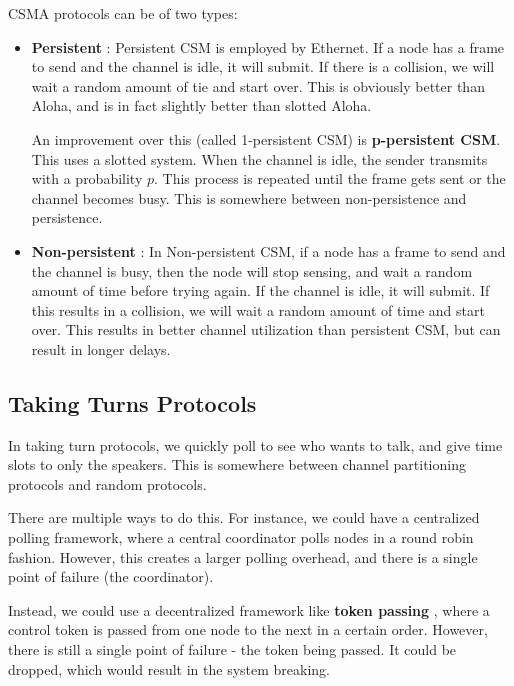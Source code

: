 \documentclass[12pt,letterpaper]{book}
\theoremstyle{definition}
\begin{document}
CSMA protocols can be of two types:
\begin{itemize}
  \item \textbf{Persistent} : Persistent CSM is employed by Ethernet. If a node has a frame to send and the channel is idle, it will submit. If there is a collision, we will wait a random amount of tie and start over. This is obviously better than Aloha, and is in fact slightly better than slotted Aloha.

    An improvement over this (called 1-persistent CSM) is \textbf{p-persistent CSM}. This uses a slotted system. When the channel is idle, the sender transmits with a probability $p$. This process is repeated until the frame gets sent or the channel becomes busy. This is somewhere between non-persistence and persistence.
  \item \textbf{Non-persistent} : In Non-persistent CSM, if a node has a frame to send and the channel is busy, then the node will stop sensing, and wait a random amount of time before trying again. If the channel is idle, it will submit. If this results in a collision, we will wait a random amount of time and start over. This results in better channel utilization than persistent CSM, but can result in longer delays.
\end{itemize}

\subsection{Taking Turns Protocols}

In taking turn protocols, we quickly poll to see who wants to talk, and give time slots to only the speakers. This is somewhere between channel partitioning protocols and random protocols.

There are multiple ways to do this. For instance, we could have a centralized polling framework, where a central coordinator polls nodes in a round robin fashion. However, this creates a larger polling overhead, and there is a single point of failure (the coordinator).

Instead, we could use a decentralized framework like \textbf{token passing} , where a control token is passed from one node to the next in a certain order. However, there is still a single point of failure - the token being passed. It could be dropped, which would result in the system breaking.
\end{document}
